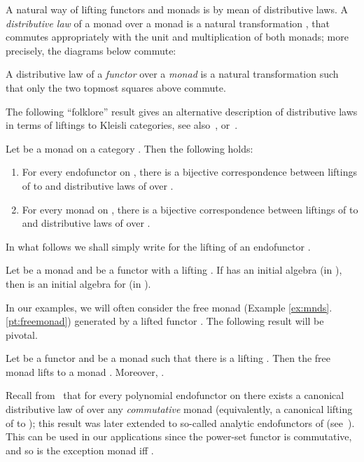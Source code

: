 \documentclass[oribibl,envcountsame,envcountsect,runningheads]{llncs}
\renewcommand{\>}{\rangle}
\begin{document}
A natural way of lifting functors and monads is by mean of distributive laws.
A {\em distributive law} of a monad  over a monad  is a
natural transformation , that commutes
appropriately with the unit and multiplication of both monads; more precisely, the diagrams below commute:

A distributive law of a {\em functor }  over a {\em monad}  is a
natural transformation  such that only the two topmost squares above commute.

The following ``folklore'' result gives an alternative description of
distributive laws in terms of liftings to Kleisli categories, see also~\cite{Johnstone75}, \cite{Mulry93} or~\cite{BalanK11}.
\begin{proposition}
\label{LiftProp}
Let  be a monad on a category . Then the following holds:
\begin{enumerate}
\item For every endofunctor  on , there is a bijective correspondence between liftings of  to  and distributive laws of  over .
\item For every monad  on , there is a bijective correspondence between liftings of  to  and distributive laws of  over .
 \end{enumerate}
\end{proposition}
In what follows we shall simply write  for the
lifting of an endofunctor .
\begin{proposition}\label{prop:liftinginitialalgebra}
 Let  be a monad and  be a functor with a lifting
 .
 If  has an initial algebra  (in ),
 then  is an initial algebra for  (in ).
\end{proposition}
In our examples, we will often consider the free monad (Example \ref{ex:mnds}.\ref{pt:freemonad})  generated by a lifted functor . The following result will be pivotal.
\newcommand{\propliftingfreemonad}{ Let  be a functor and  be a monad such that there is a lifting
 . Then the free monad  lifts to a monad
 . Moreover, .}
\begin{proposition}\label{prop:liftingfreemonad}
\propliftingfreemonad
\end{proposition}


Recall from~\cite{HasuoJS:07} that for every polynomial endofunctor
 on  there exists a canonical distributive law of  over
any \emph{commutative} monad  (equivalently, a canonical lifting of
 to ); this result was later extended to so-called analytic
endofunctors of  (see~\cite{mps:09}). This can be used in our
applications since the power-set functor  is commutative, and so
is the exception monad  iff .
\end{document}
